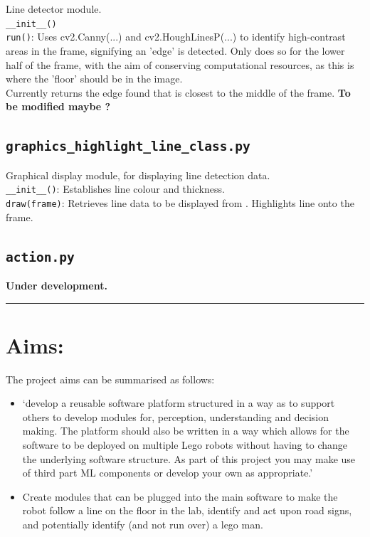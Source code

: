 \documentclass[10pt]{article}
\newcommand{\divider}{\vskip2pt\hrule\vskip2pt}
\begin{document}
Line detector module.
\\
\texttt{\_\_init\_\_()}
\\\texttt{run()}: Uses cv2.Canny(...) and cv2.HoughLinesP(...) to identify high-contrast areas in the frame, signifying an 'edge' is detected. Only does so for the lower half of the frame, with the aim of conserving computational resources, as this is where the 'floor' should be in the image. 
\\Currently returns the edge found that is closest to the middle of the frame. \textbf{To be modified maybe ?}

\subsection{\texttt{graphics\_highlight\_line\_class.py}}
\label{sec:graphics_highlight_line_class.py}

Graphical display module, for displaying  line detection data.
\\
\texttt{\_\_init\_\_()}: Establishes line colour and thickness.
\\\texttt{draw(frame)}: Retrieves line data to be displayed from . Highlights line onto the frame.

\subsection{\texttt{action.py}}
\label{sec:action.py}

\textbf{Under development.}

\divider 

\section*{Aims:}

The project aims can be summarised as follows:
\begin{itemize}
    \item `develop a reusable software platform structured in a way as to support others to develop modules for, perception, understanding and decision making. The platform should also be written in a way which allows for the software to be deployed on multiple Lego robots without having to change the underlying software structure. As part of this project you may make use of third part ML components or develop your own as appropriate.'
    \item Create modules that can be plugged into the main software to make the robot follow a line on the floor in the lab, identify and act upon road signs, and potentially identify (and not run over) a lego man.
\end{itemize}
\end{document}
